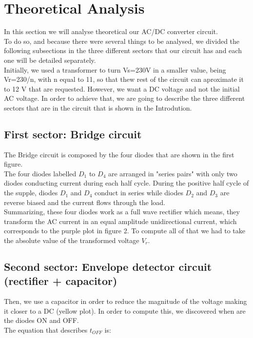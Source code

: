 \section{Theoretical Analysis}
\label{sec:analysis}

In this section we will analyse theoretical our AC/DC converter circuit. \\
To do so, and because there were several things to be analysed, we divided the following subsections in the three different sectors that our circuit has and each one will be detailed separately.\\
Initially, we used a transformer to turn Vs=230V in a smaller value, being Vr=230/n, with n equal to 11, so that thew
rest of the circuit can aproximate it to 12 V that are requested. However, we want a DC voltage and not the initial AC voltage. In order
to achieve that, we are going to describe the three different sectors that are in the circuit that is shown in the Introdution.\\


\subsection{First sector: Bridge circuit}

The Bridge circuit is composed by the four diodes that are shown in the first figure.\\
The four diodes labelled $D_1$ to $D_4$ are arranged in "series pairs" with only two diodes conducting current during each half cycle. During the positive half cycle of the supple, diodes $D_1$ and $D_4$ conduct in series while diodes $D_2$ and $D_3$ are reverse biased and the current flows through the load.\\
Summarizing, these four diodes work as a full wave rectifier which means, they transform the AC current in an equal
amplitude unidirectional current, which corresponds to the purple plot in figure 2. To compute all of that we had to take the absolute value of the transformed voltage $V_r$.

\subsection{Second sector: Envelope detector circuit (rectifier + capacitor)}

Then, we use a capacitor in order to reduce the magnitude of the voltage making it closer to a DC (yellow plot).
In order to compute this, we discovered when are the diodes ON and OFF.\\
The equation that describes $t_{OFF}$ is:

